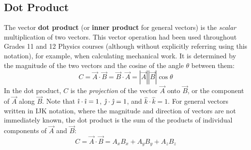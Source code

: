 \documentclass{../../oss-handout}
\newcommand{\iii}{\ensuremath\hat\imath}
\newcommand{\jjj}{\ensuremath\hat\jmath}
\newcommand{\kkk}{\ensuremath{\hat k}}
\begin{document}
\subsection{Dot Product}
The vector \textbf{dot product} (or \textbf{inner product} for general vectors)
is the \emph{scalar} multiplication of two vectors. This vector operation had
been used throughout Grades 11 and 12 Physics courses (although without
explicitly referring using this notation), for example, when calculating
mechanical work. It is determined by the magnitude of the two vectors and the
cosine of the angle $\theta$ between them:
\begin{equation*}
  C=\vec A\cdot\vec B=\vec B\cdot\vec A=|\vec A||\vec B|\cos\theta
\end{equation*}
In the dot product, $C$ is the \emph{projection} of the vector $\vec A$ onto
$\vec B$, or the component of $\vec A$ along $\vec B$. Note that
$\iii\cdot\iii=1$, $\jjj\cdot\jjj=1$, and $\kkk\cdot\kkk=1$. For general
vectors written in IJK notation, where the magnitude and direction of vectors
are not immediately known, the dot product is the sum of the products of
individual components of $\vec A$ and $\vec B$:
\begin{equation*}
  C=\vec A\cdot\vec B=A_xB_x+A_yB_y+A_zB_z
\end{equation*}
\end{document}

